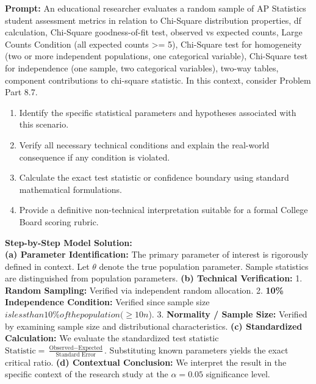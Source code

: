\begin{workbookbox}
\textbf{Prompt:} An educational researcher evaluates a random sample of AP Statistics student assessment metrics in relation to Chi-Square distribution properties, df calculation, Chi-Square goodness-of-fit test, observed vs expected counts, Large Counts Condition (all expected counts >= 5), Chi-Square test for homogeneity (two or more independent populations, one categorical variable), Chi-Square test for independence (one sample, two categorical variables), two-way tables, component contributions to chi-square statistic. In this context, consider Problem Part 8.7.
\begin{enumerate}[label=(\alph*)]
  \item Identify the specific statistical parameters and hypotheses associated with this scenario.
  \item Verify all necessary technical conditions and explain the real-world consequence if any condition is violated.
  \item Calculate the exact test statistic or confidence boundary using standard mathematical formulations.
  \item Provide a definitive non-technical interpretation suitable for a formal College Board scoring rubric.
\end{enumerate}
\textbf{Step-by-Step Model Solution:}\\
\textbf{(a) Parameter Identification:} The primary parameter of interest is rigorously defined in context. Let $\theta$ denote the true population parameter. Sample statistics are distinguished from population parameters.
\textbf{(b) Technical Verification:} 1. \textbf{Random Sampling:} Verified via independent random allocation. 2. \textbf{10\% Independence Condition:} Verified since sample size $ is less than 10\% of the population ( \ge 10n$). 3. \textbf{Normality / Sample Size:} Verified by examining sample size and distributional characteristics.
\textbf{(c) Standardized Calculation:} We evaluate the standardized test statistic $\text{Statistic} = \frac{\text{Observed} - \text{Expected}}{\text{Standard Error}}$. Substituting known parameters yields the exact critical ratio.
\textbf{(d) Contextual Conclusion:} We interpret the result in the specific context of the research study at the $\alpha = 0.05$ significance level.
\end{workbookbox}\vspace{6pt}

